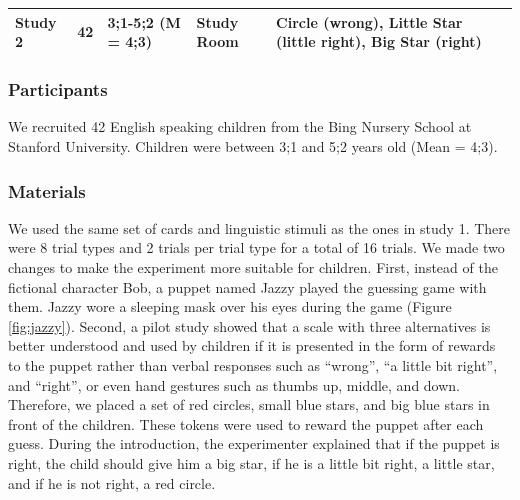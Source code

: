 \documentclass[floatsintext,man]{apa6}
\theoremstyle{definition}
\theoremstyle{definition}
\theoremstyle{definition}
\theoremstyle{remark}
\begin{document}
\begin{longtable}[]{@{}lllll@{}}
\begin{minipage}[t]{0.11\columnwidth}
Study 2\strut
\end{minipage} & \begin{minipage}[t]{0.04\columnwidth}\raggedright\strut
42\strut
\end{minipage} & \begin{minipage}[t]{0.21\columnwidth}\raggedright\strut
3;1-5;2 (M = 4;3)\strut
\end{minipage} & \begin{minipage}[t]{0.17\columnwidth}\raggedright\strut
Study Room\strut
\end{minipage} & \begin{minipage}[t]{0.32\columnwidth}\raggedright\strut
Circle (wrong), Little Star (little right), Big Star (right)\strut
\end{minipage}\tabularnewline
\bottomrule
\end{longtable}

\subsubsection{Participants}\label{participants-1}

We recruited 42 English speaking children from the Bing Nursery School
at Stanford University. Children were between 3;1 and 5;2 years old
(Mean = 4;3).

\subsubsection{Materials}\label{materials}

We used the same set of cards and linguistic stimuli as the ones in
study 1. There were 8 trial types and 2 trials per trial type for a
total of 16 trials. We made two changes to make the experiment more
suitable for children. First, instead of the fictional character Bob, a
puppet named Jazzy played the guessing game with them. Jazzy wore a
sleeping mask over his eyes during the game (Figure \ref{fig:jazzy}).
Second, a pilot study showed that a scale with three alternatives is
better understood and used by children if it is presented in the form of
rewards to the puppet rather than verbal responses such as
\enquote{wrong}, \enquote{a little bit right}, and \enquote{right}, or
even hand gestures such as thumbs up, middle, and down. Therefore, we
placed a set of red circles, small blue stars, and big blue stars in
front of the children. These tokens were used to reward the puppet after
each guess. During the introduction, the experimenter explained that if
the puppet is right, the child should give him a big star, if he is a
little bit right, a little star, and if he is not right, a red circle.
\end{document}
